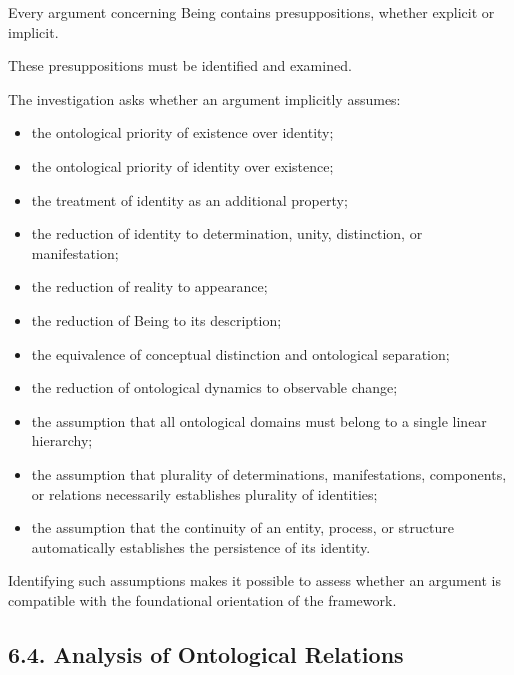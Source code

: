 Every argument concerning Being contains
presuppositions, whether explicit
or implicit.

These presuppositions must be identified
and examined.

The investigation asks whether an
argument implicitly assumes:

\begin{itemize}

    \item the ontological priority of
    existence over identity;

    \item the ontological priority of
    identity over existence;

    \item the treatment of identity
    as an additional property;

    \item the reduction of identity
    to determination, unity, distinction,
    or manifestation;

    \item the reduction of reality
    to appearance;

    \item the reduction of Being
    to its description;

    \item the equivalence of conceptual
    distinction and ontological
    separation;

    \item the reduction of ontological
    dynamics to observable change;

    \item the assumption that all
    ontological domains must belong
    to a single linear hierarchy;

    \item the assumption that plurality
    of determinations, manifestations,
    components, or relations necessarily
    establishes plurality of identities;

    \item the assumption that the
    continuity of an entity, process,
    or structure automatically
    establishes the persistence
    of its identity.

\end{itemize}

Identifying such assumptions makes
it possible to assess whether an
argument is compatible with the
foundational orientation of the
framework.

\subsection*{6.4. Analysis of Ontological Relations}

